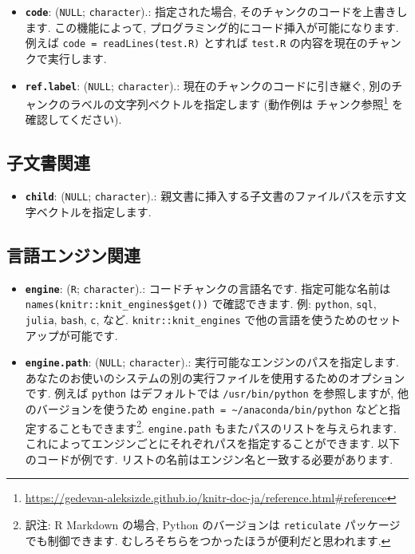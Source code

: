 \documentclass[
  11pt,
]{bxjsreport}
\providecommand{\tightlist}{%
  \setlength{\itemsep}{0pt}\setlength{\parskip}{0pt}}
\renewcommand{\href}[2]{#2\footnote{\url{#1}}}
\begin{document}
\begin{itemize}
\tightlist
\item
  \textbf{\texttt{code}}: (\texttt{NULL}; \texttt{character}).: 指定された場合, そのチャンクのコードを上書きします. この機能によって, プログラミング的にコード挿入が可能になります. 例えば \texttt{code = readLines(\textquotesingle{}test.R\textquotesingle{})} とすれば \texttt{test.R} の内容を現在のチャンクで実行します.
\item
  \textbf{\texttt{ref.label}}: (\texttt{NULL}; \texttt{character}).: 現在のチャンクのコードに引き継ぐ, 別のチャンクのラベルの文字列ベクトルを指定します (動作例は \href{https://gedevan-aleksizde.github.io/knitr-doc-ja/reference.html\#reference}{チャンク参照} を確認してください).
\end{itemize}

\hypertarget{child-document-appendix}{%
\subsection{子文書関連}\label{child-document-appendix}}

\begin{itemize}
\tightlist
\item
  \textbf{\texttt{child}}: (\texttt{NULL}; \texttt{character}).: 親文書に挿入する子文書のファイルパスを示す文字ベクトルを指定します.
\end{itemize}

\hypertarget{engine}{%
\subsection{言語エンジン関連}\label{engine}}

\begin{itemize}
\tightlist
\item
  \textbf{\texttt{engine}}: (\texttt{\textquotesingle{}R\textquotesingle{}}; \texttt{character}).: コードチャンクの言語名です. 指定可能な名前は \texttt{names(knitr::knit\_engines\$get())} で確認できます. 例: \texttt{python}, \texttt{sql}, \texttt{julia}, \texttt{bash}, \texttt{c}, など. \texttt{knitr::knit\_engines} で他の言語を使うためのセットアップが可能です.
\item
  \textbf{\texttt{engine.path}}: (\texttt{NULL}; \texttt{character}).: 実行可能なエンジンのパスを指定します. あなたのお使いのシステムの別の実行ファイルを使用するためのオプションです. 例えば \texttt{python} はデフォルトでは \texttt{/usr/bin/python} を参照しますが, 他のバージョンを使うため \texttt{engine.path = \textquotesingle{}\textasciitilde{}/anaconda/bin/python\textquotesingle{}} などと指定することもできます\footnote{訳注: R Markdown の場合, Python のバージョンは \texttt{reticulate} パッケージでも制御できます. むしろそちらをつかったほうが便利だと思われます.}. \texttt{engine.path} もまたパスのリストを与えられます. これによってエンジンごとにそれぞれパスを指定することができます. 以下のコードが例です. リストの名前はエンジン名と一致する必要があります.
\end{itemize}
\end{document}
